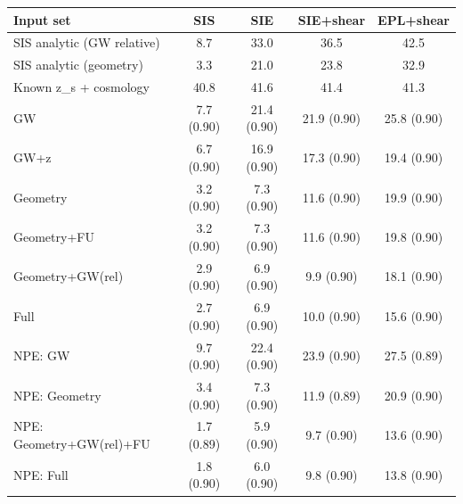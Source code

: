 \begin{tabular*}{\linewidth}{@{\extracolsep{\fill}}lcccc@{}}
\toprule
Input set & SIS & SIE & SIE+shear & EPL+shear \\
\midrule
SIS analytic (GW relative) & 8.7 & 33.0 & 36.5 & 42.5 \\
SIS analytic (geometry) & 3.3 & 21.0 & 23.8 & 32.9 \\
Known z\_s + cosmology & 40.8 & 41.6 & 41.4 & 41.3 \\
\midrule
GW & 7.7 (0.90) & 21.4 (0.90) & 21.9 (0.90) & 25.8 (0.90) \\
GW+z & 6.7 (0.90) & 16.9 (0.90) & 17.3 (0.90) & 19.4 (0.90) \\
Geometry & 3.2 (0.90) & 7.3 (0.90) & 11.6 (0.90) & 19.9 (0.90) \\
Geometry+FU & 3.2 (0.90) & 7.3 (0.90) & 11.6 (0.90) & 19.8 (0.90) \\
Geometry+GW(rel) & 2.9 (0.90) & 6.9 (0.90) & 9.9 (0.90) & 18.1 (0.90) \\
Full & 2.7 (0.90) & 6.9 (0.90) & 10.0 (0.90) & 15.6 (0.90) \\
\midrule
NPE: GW & 9.7 (0.90) & 22.4 (0.90) & 23.9 (0.90) & 27.5 (0.89) \\
NPE: Geometry & 3.4 (0.90) & 7.3 (0.90) & 11.9 (0.89) & 20.9 (0.90) \\
NPE: Geometry+GW(rel)+FU & 1.7 (0.89) & 5.9 (0.90) & 9.7 (0.90) & 13.6 (0.90) \\
NPE: Full & 1.8 (0.90) & 6.0 (0.90) & 9.8 (0.90) & 13.8 (0.90) \\
\bottomrule
\end{tabular*}
